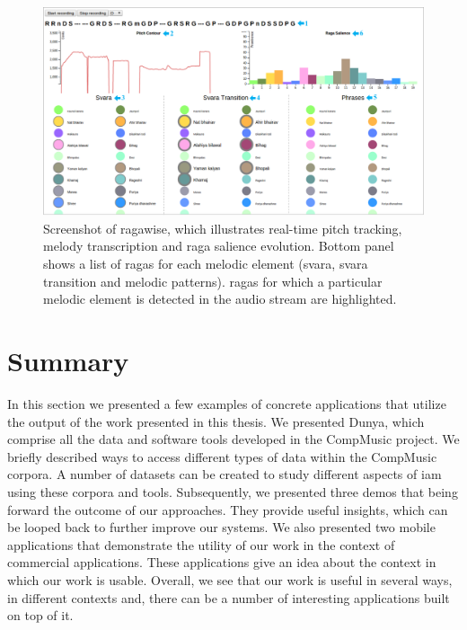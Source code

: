 \begin{figure}
	\begin{center}
		\includegraphics[width=\figSizeHundred]{ch08_applications/figures/ragawise.pdf}
	\end{center}
	\caption{Screenshot of \gls{ragawise}, which illustrates real-time pitch tracking, melody transcription and \gls{raga} salience evolution. Bottom panel shows a list of \glspl{raga} for each melodic element (\gls{svara}, \gls{svara} transition and melodic patterns). \Glspl{raga} for which a particular melodic element is detected in the audio stream are highlighted.}
	\label{fig:ragawise}
\end{figure}

%

\section{Summary}
\label{sec:applications_summary}

In this section we presented a few examples of concrete applications that utilize the output of the work presented in this thesis. We presented Dunya, which comprise all the data and software tools developed in the CompMusic project. We briefly described ways to access different types of data within the CompMusic corpora. A number of datasets can be created to study different aspects of \gls{iam} using these corpora and tools. Subsequently, we presented three demos that being forward the outcome of our approaches. They provide useful insights, which can be looped back to further improve our systems. We also presented two mobile applications that demonstrate the utility of our work in the context of commercial applications. These applications give an idea about the context in which our work is usable. Overall, we see that our work is useful in several ways, in different contexts and, there can be a number of interesting applications built on top of it. 



